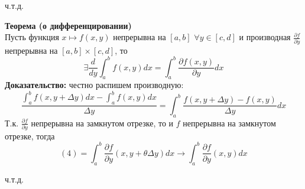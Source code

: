 \documentclass[book, 11pt]{report}
\begin{document}
\par{{\raggedleft ч.т.д.\par}}
    \vspace{0.5cm}
\par{\textbf{Теорема (о дифференцировании)}\\
Пусть функция $x\mapsto f(x,y)$ непрерывна на $[a,b]$ $\forall y\in[c,d]$ и производная $\frac{\partial f}{\partial y}$ непрерывна на $[a,b]\times[c,d]$, то
\begin{equation*}
    \exists\frac{d}{dy}\int_a^bf(x,y)dx=\int_a^b\frac{\partial f(x,y)}{\partial y}dx
\end{equation*}
\textbf{Доказательство: } честно распишем производную:
\begin{equation}
    \frac{\displaystyle\int_a^bf(x,y+\Delta y)dx-\int_a^bf(x,y)dx}{\Delta y}=\int_a^b\frac{f(x,y+\Delta y)-f(x,y)}{\Delta y}dx
\end{equation}
Т.к. $\frac{\partial f}{\partial y}$ непрерывна на замкнутом отрезке, то и $f$ непрерывна на замкнутом отрезке, тогда
\begin{equation}
    (4)=\int_a^b\frac{\partial f}{\partial y}(x,y+\theta\Delta y)dx\to\int_a^b\frac{\partial f}{\partial y}(x,y)dx
\end{equation}
}
\par{{\raggedleft ч.т.д.\par}}
\newpage
\end{document}
